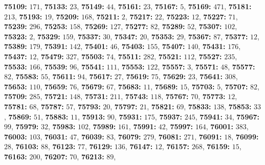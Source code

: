 \textsf{\bfseries 75109:} $171$, \textsf{\bfseries 75133:} $23$, \textsf{\bfseries 75149:} $44$, \textsf{\bfseries 75161:} $23$, \textsf{\bfseries 75167:} $5$, \textsf{\bfseries 75169:} $471$, \textsf{\bfseries 75181:} $213$, \textsf{\bfseries 75193:} $19$, \textsf{\bfseries 75209:} $168$, \textsf{\bfseries 75211:} $2$, \textsf{\bfseries 75217:} $22$, \textsf{\bfseries 75223:} $12$, \textsf{\bfseries 75227:} $71$, \textsf{\bfseries 75239:} $296$, \textsf{\bfseries 75253:} $158$, \textsf{\bfseries 75269:} $127$, \textsf{\bfseries 75277:} $82$, \textsf{\bfseries 75289:} $52$, \textsf{\bfseries 75307:} $102$, \textsf{\bfseries 75323:} $2$, \textsf{\bfseries 75329:} $159$, \textsf{\bfseries 75337:} $30$, \textsf{\bfseries 75347:} $20$, \textsf{\bfseries 75353:} $29$, \textsf{\bfseries 75367:} $87$, \textsf{\bfseries 75377:} $12$, \textsf{\bfseries 75389:} $179$, \textsf{\bfseries 75391:} $142$, \textsf{\bfseries 75401:} $46$, \textsf{\bfseries 75403:} $155$, \textsf{\bfseries 75407:} $140$, \textsf{\bfseries 75431:} $176$, \textsf{\bfseries 75437:} $12$, \textsf{\bfseries 75479:} $327$, \textsf{\bfseries 75503:} $74$, \textsf{\bfseries 75511:} $282$, \textsf{\bfseries 75521:} $112$, \textsf{\bfseries 75527:} $235$, \textsf{\bfseries 75533:} $166$, \textsf{\bfseries 75539:} $96$, \textsf{\bfseries 75541:} $111$, \textsf{\bfseries 75553:} $122$, \textsf{\bfseries 75557:} $3$, \textsf{\bfseries 75571:} $48$, \textsf{\bfseries 75577:} $82$, \textsf{\bfseries 75583:} $55$, \textsf{\bfseries 75611:} $94$, \textsf{\bfseries 75617:} $27$, \textsf{\bfseries 75619:} $75$, \textsf{\bfseries 75629:} $23$, \textsf{\bfseries 75641:} $308$, \textsf{\bfseries 75653:} $110$, \textsf{\bfseries 75659:} $76$, \textsf{\bfseries 75679:} $67$, \textsf{\bfseries 75683:} $11$, \textsf{\bfseries 75689:} $15$, \textsf{\bfseries 75703:} $5$, \textsf{\bfseries 75707:} $82$, \textsf{\bfseries 75709:} $285$, \textsf{\bfseries 75721:} $148$, \textsf{\bfseries 75731:} $211$, \textsf{\bfseries 75743:} $118$, \textsf{\bfseries 75767:} $70$, \textsf{\bfseries 75773:} $12$, \textsf{\bfseries 75781:} $68$, \textsf{\bfseries 75787:} $57$, \textsf{\bfseries 75793:} $20$, \textsf{\bfseries 75797:} $21$, \textsf{\bfseries 75821:} $69$, \textsf{\bfseries 75833:} $138$, \textsf{\bfseries 75853:} $33$, \textsf{\bfseries 75869:} $51$, \textsf{\bfseries 75883:} $11$, \textsf{\bfseries 75913:} $90$, \textsf{\bfseries 75931:} $175$, \textsf{\bfseries 75937:} $245$, \textsf{\bfseries 75941:} $34$, \textsf{\bfseries 75967:} $99$, \textsf{\bfseries 75979:} $32$, \textsf{\bfseries 75983:} $102$, \textsf{\bfseries 75989:} $161$, \textsf{\bfseries 75991:} $42$, \textsf{\bfseries 75997:} $164$, \textsf{\bfseries 76001:} $383$, \textsf{\bfseries 76003:} $103$, \textsf{\bfseries 76031:} $47$, \textsf{\bfseries 76039:} $83$, \textsf{\bfseries 76079:} $279$, \textsf{\bfseries 76081:} $271$, \textsf{\bfseries 76091:} $18$, \textsf{\bfseries 76099:} $28$, \textsf{\bfseries 76103:} $88$, \textsf{\bfseries 76123:} $77$, \textsf{\bfseries 76129:} $136$, \textsf{\bfseries 76147:} $12$, \textsf{\bfseries 76157:} $268$, \textsf{\bfseries 76159:} $15$, \textsf{\bfseries 76163:} $200$, \textsf{\bfseries 76207:} $70$, \textsf{\bfseries 76213:} $89$, 
